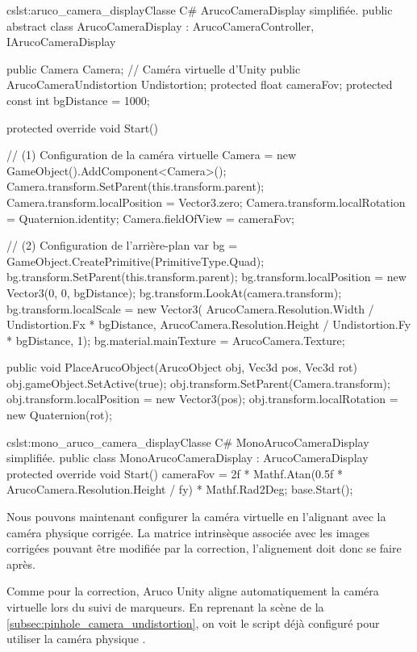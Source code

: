 \begin{listingETS}{cs}{lst:aruco_camera_display}{Classe C\# ArucoCameraDisplay simplifiée.}
  public abstract class ArucoCameraDisplay : ArucoCameraController, IArucoCameraDisplay
  {
    public Camera Camera; // Caméra virtuelle d'Unity
    public ArucoCameraUndistortion Undistortion;
    protected float cameraFov;
    protected const int bgDistance = 1000;

    protected override void Start()
    {
      // (1) Configuration de la caméra virtuelle
      Camera = new GameObject().AddComponent<Camera>();
      Camera.transform.SetParent(this.transform.parent);
      Camera.transform.localPosition = Vector3.zero;
      Camera.transform.localRotation = Quaternion.identity;
      Camera.fieldOfView = cameraFov;

      // (2) Configuration de l'arrière-plan
      var bg = GameObject.CreatePrimitive(PrimitiveType.Quad);
      bg.transform.SetParent(this.transform.parent);
      bg.transform.localPosition = new Vector3(0, 0, bgDistance);
      bg.transform.LookAt(camera.transform);
      bg.transform.localScale = new Vector3(
        ArucoCamera.Resolution.Width / Undistortion.Fx * bgDistance,
        ArucoCamera.Resolution.Height / Undistortion.Fy * bgDistance, 1);
      bg.material.mainTexture = ArucoCamera.Texture;
    }

    public void PlaceArucoObject(ArucoObject obj, Vec3d pos, Vec3d rot)
    {
      obj.gameObject.SetActive(true);
      obj.transform.SetParent(Camera.transform);
      obj.transform.localPosition = new Vector3(pos);
      obj.transform.localRotation = new Quaternion(rot);
    }
  }
\end{listingETS}

\begin{listingETS}{cs}{lst:mono_aruco_camera_display}{Classe C\# MonoArucoCameraDisplay simplifiée.}
  public class MonoArucoCameraDisplay : ArucoCameraDisplay
  {
    protected override void Start()
    {
      cameraFov = 2f * Mathf.Atan(0.5f * ArucoCamera.Resolution.Height / fy) * Mathf.Rad2Deg;
      base.Start();
    }
  }
\end{listingETS}

Nous pouvons maintenant configurer la caméra virtuelle en l'alignant avec la caméra physique corrigée. La matrice intrinsèque associée avec les images corrigées pouvant être modifiée par la correction, l'alignement doit donc se faire après.

Comme pour la correction, Aruco Unity aligne automatiquement la caméra virtuelle lors du suivi de marqueurs. En reprenant la scène de la \autoref{subsec:pinhole_camera_undistortion}, on voit le script déjà configuré pour utiliser la caméra physique .

